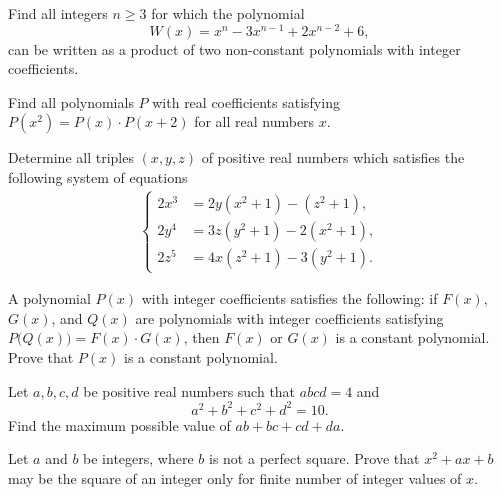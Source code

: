 \documentclass[12pt,a4paper]{memoir}
\theoremstyle{definition}
\begin{document}
\begin{question}[name={2005 Czech and Slovak}]
	Find all integers $n \ge 3$ for which the polynomial
	\[W(x) = x^n - 3x^{n-1} + 2x^{n-2} + 6,\]
	can be written as a product of two non-constant polynomials with integer coefficients.
\end{question}


\begin{question}[name={2007 Czech and Slovak}]
	Find all polynomials $P$ with real coefficients satisfying $P(x^2)=P(x)\cdot P(x+2)$ for all real numbers $x$.
\end{question}



\begin{question}[name={2008 Czech and Slovak}]
	Determine all triples $(x, y, z)$ of positive real numbers which satisfies the following system of equations
	\begin{align*}
		\begin{cases}
			2x^3 &= 2y(x^2+1)-(z^2+1),\\
			2y^4 &= 3z(y^2+1)-2(x^2+1),\\
			2z^5 &= 4x(z^2+1)-3(y^2+1).
		\end{cases}
	\end{align*}
\end{question}


\begin{question}[name={2011 Czech and Slovak}]
	A polynomial $P(x)$ with integer coefficients satisfies the following: if $F(x)$, $G(x)$, and $Q(x)$ are polynomials with integer coefficients satisfying $P\Big(Q(x)\Big)=F(x)\cdot G(x)$, then $F(x)$ or $G(x)$ is a constant polynomial. Prove that $P(x)$ is a constant polynomial.
\end{question}

\begin{question}[name={2012 Czech and Slovak}]
	Let $a,b,c,d$ be positive real numbers such that $abcd=4$ and
	\[a^2+b^2+c^2+d^2=10.\]
	Find the maximum possible value of $ab+bc+cd+da$.
\end{question}


\begin{question}[name={2013 Czech and Slovak}]
	Let $a$ and $b$ be integers, where $b$ is not a perfect square. Prove that $x^2 + ax + b$ may be the square of an integer only for finite number of integer values of $x$.
\end{question}
\end{document}
